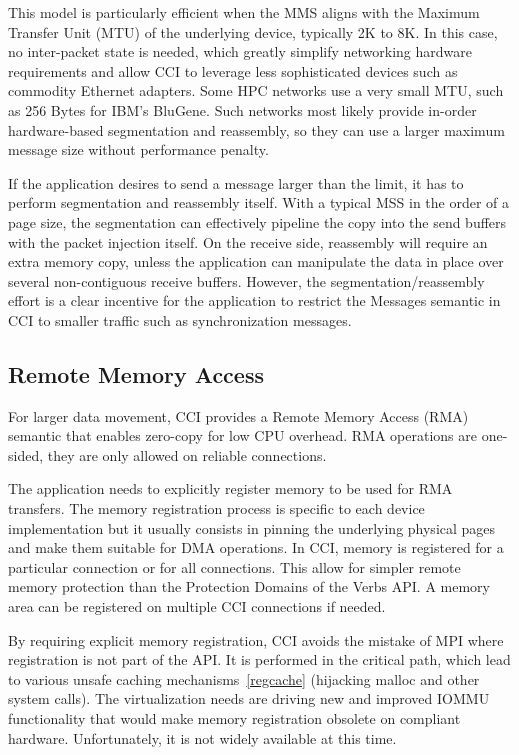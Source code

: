 This model is particularly efficient when the MMS aligns with the Maximum 
Transfer Unit (MTU) of the underlying device, typically 2K to 8K. 
In this case, no inter-packet state is needed, which greatly simplify 
networking hardware requirements and allow CCI to leverage less 
sophisticated devices such as commodity Ethernet adapters. 
Some HPC networks use a very small MTU, such as 256 Bytes for 
IBM's BluGene. Such networks most likely 
provide in-order hardware-based segmentation and reassembly, so they 
can use a larger maximum message size without performance penalty.

If the application desires to send a message larger than the limit, it has 
to perform segmentation and reassembly itself. With a typical MSS in the order 
of a page size, the segmentation can effectively pipeline the copy into the 
send buffers with the packet injection itself. On the receive side, 
reassembly will require an extra memory copy, unless the application can 
manipulate the data in place over several non-contiguous receive buffers.
However, the segmentation/reassembly effort is a clear incentive for the 
application to restrict the Messages semantic in CCI to smaller traffic 
such as synchronization messages.

\subsection{Remote Memory Access}
For larger data movement, CCI provides a Remote Memory Access (RMA) semantic 
that enables zero-copy for low CPU overhead. RMA operations are one-sided, 
they are only allowed on reliable connections. 

The application needs to explicitly register memory to be used for RMA 
transfers. The memory registration process is specific to each device 
implementation but it usually consists in pinning the underlying physical 
pages and make them suitable for DMA operations. In CCI, memory is registered 
for a particular connection or for all connections. This allow for simpler 
remote memory protection than the Protection Domains of the Verbs API. A 
memory area can be registered on multiple CCI connections if needed.

By requiring explicit memory registration, CCI avoids the mistake of MPI 
where registration is not part of the API. It is performed in the critical 
path, which lead to various unsafe caching mechanisms~\ref{regcache} 
(hijacking malloc and other system calls). 
The virtualization needs are driving new and improved IOMMU functionality 
that would make memory registration obsolete on compliant hardware. 
Unfortunately, it is not widely available at this time.

